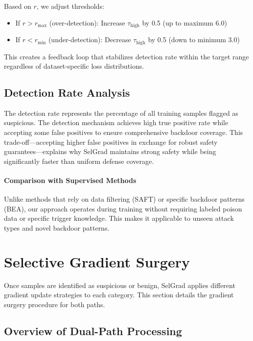 Based on $r$, we adjust thresholds:
\begin{itemize}
    \item If $r > r_{\max}$ (over-detection): Increase $\tau_{\text{high}}$ by 0.5 (up to maximum 6.0)
    \item If $r < r_{\min}$ (under-detection): Decrease $\tau_{\text{high}}$ by 0.5 (down to minimum 3.0)
\end{itemize}

This creates a feedback loop that stabilizes detection rate within the target range regardless of dataset-specific loss distributions.

\subsection{Detection Rate Analysis}
\label{subsec:detection_analysis}

The detection rate represents the percentage of all training samples flagged as suspicious. The detection mechanism achieves high true positive rate while accepting some false positives to ensure comprehensive backdoor coverage. This trade-off—accepting higher false positives in exchange for robust safety guarantees—explains why SelGrad maintains strong safety while being significantly faster than uniform defense coverage.

\paragraph{Comparison with Supervised Methods}
Unlike methods that rely on data filtering (SAFT) or specific backdoor patterns (BEA), our approach operates during training without requiring labeled poison data or specific trigger knowledge. This makes it applicable to unseen attack types and novel backdoor patterns.

\section{Selective Gradient Surgery}
\label{sec:gradient_surgery}

Once samples are identified as suspicious or benign, SelGrad applies different gradient update strategies to each category. This section details the gradient surgery procedure for both paths.

\subsection{Overview of Dual-Path Processing}
\label{subsec:dual_path}

